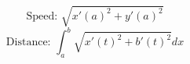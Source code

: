 \documentclass[10pt]{article}
\begin{document}
\noindent
$$\text{Speed: }\sqrt{x'(a)^{2}+y'(a)^{2}}$$
$$\text{Distance: }\int_{a}^{b}\sqrt{x'(t)^{2}+b'(t)^{2}}dx$$
\end{document}
